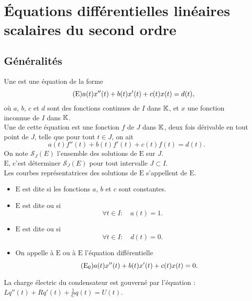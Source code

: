 \documentclass{book}
\begin{document}
\section{Équations différentielles linéaires scalaires du second ordre}

\subsection{Généralités}
\begin{Definition}
Une 
est une équation de la forme
\[\tag{$\mathrm{E}$} a(t) x''(t) + b(t) x'(t) + c(t) x(t) = d(t),\]
où $a$, $b$, $c$ et $d$ sont des fonctions continues de $I$ dans $\mathbb{K}$,
et $x$ une fonction inconnue de $I$ dans $\mathbb{K}     $.\\
Une  de cette équation est une fonction $f$ de $J$ dans $\mathbb{K}     $,
deux fois dérivable en tout point de $J$, telle que pour tout $t\in J$, on ait
\[a(t) f''(t) + b(t) f'(t) + c(t) f(t) = d(t).\]
On note $\mathcal{S}_J(E)$ l'ensemble des solutions de $\mathrm{E}$ sur $J$.\\
 $\mathrm{E}$, c'est déterminer $\mathcal{S}_J(E)$ pour tout intervalle $J\subset I$.\\
Les courbes représentatrices des solutions de $\mathrm{E}$ s'appellent  de $\mathrm{E}$.\\
\begin{itemize}
\item $\mathrm{E}$ est dite 
  si  les fonctions $a$, $b$ et $c$ sont constantes.
\item $\mathrm{E}$ est dite  ou 
  si  \[\forall t\in I:\quad a(t) = 1.\]
\item $\mathrm{E}$ est dite  ou 
  si \[\forall t\in I:\quad d(t) = 0.\]
\item On appelle  à $\mathrm{E}$
  ou  à $\mathrm{E}$
  l'équation différentielle
  \[\tag{$\mathrm{E_0}$} a(t) x''(t) + b(t) x'(t) + c(t) x(t) = 0.\]
\end{itemize}
\end{Definition}
\begin{Exemple}
La charge électric du condensateur est gouverné par l'équation : $Lq''(t)+ Rq'(t)+\frac 1 C q(t)=U(t).$
\end{Exemple}
\end{document}
